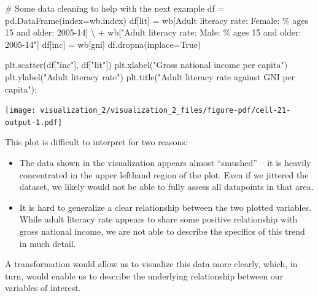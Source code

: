\documentclass[
  letterpaper,
  DIV=11,
  numbers=noendperiod]{scrreprt}
\newenvironment{Shaded}{\begin{snugshade}}{\end{snugshade}}
\newcommand{\CommentTok}[1]{\textcolor[rgb]{0.37,0.37,0.37}{#1}}
\newcommand{\NormalTok}[1]{\textcolor[rgb]{0.00,0.23,0.31}{#1}}
\newcommand{\OperatorTok}[1]{\textcolor[rgb]{0.37,0.37,0.37}{#1}}
\newcommand{\StringTok}[1]{\textcolor[rgb]{0.13,0.47,0.30}{#1}}
\newcommand{\VariableTok}[1]{\textcolor[rgb]{0.07,0.07,0.07}{#1}}
\providecommand{\tightlist}{%
  \setlength{\itemsep}{0pt}\setlength{\parskip}{0pt}}\usepackage{longtable,booktabs,array}
\begin{document}
\begin{Shaded}
\begin{Highlighting}[]
\CommentTok{\# Some data cleaning to help with the next example}
\NormalTok{df }\OperatorTok{=}\NormalTok{ pd.DataFrame(index}\OperatorTok{=}\NormalTok{wb.index)}
\NormalTok{df[}\StringTok{\textquotesingle{}lit\textquotesingle{}}\NormalTok{] }\OperatorTok{=}\NormalTok{ wb[}\StringTok{\textquotesingle{}Adult literacy rate: Female: \% ages 15 and older: 2005{-}14\textquotesingle{}}\NormalTok{] }\OperatorTok{\textbackslash{}}
            \OperatorTok{+}\NormalTok{ wb[}\StringTok{"Adult literacy rate: Male: \% ages 15 and older: 2005{-}14"}\NormalTok{]}
\NormalTok{df[}\StringTok{\textquotesingle{}inc\textquotesingle{}}\NormalTok{] }\OperatorTok{=}\NormalTok{ wb[}\StringTok{\textquotesingle{}gni\textquotesingle{}}\NormalTok{]}
\NormalTok{df.dropna(inplace}\OperatorTok{=}\VariableTok{True}\NormalTok{)}

\NormalTok{plt.scatter(df[}\StringTok{"inc"}\NormalTok{], df[}\StringTok{"lit"}\NormalTok{])}
\NormalTok{plt.xlabel(}\StringTok{"Gross national income per capita"}\NormalTok{)}
\NormalTok{plt.ylabel(}\StringTok{"Adult literacy rate"}\NormalTok{)}
\NormalTok{plt.title(}\StringTok{"Adult literacy rate against GNI per capita"}\NormalTok{)}\OperatorTok{;}
\end{Highlighting}
\end{Shaded}

\texttt{[image: visualization\_2/visualization\_2\_files/figure-pdf/cell-21-output-1.pdf]}

This plot is difficult to interpret for two reasons:

\begin{itemize}
\tightlist
\item
  The data shown in the visualization appears almost ``smushed'' -- it
  is heavily concentrated in the upper lefthand region of the plot. Even
  if we jittered the dataset, we likely would not be able to fully
  assess all datapoints in that area.
\item
  It is hard to generalize a clear relationship between the two plotted
  variables. While adult literacy rate appears to share some positive
  relationship with gross national income, we are not able to describe
  the specifics of this trend in much detail.
\end{itemize}

A transformation would allow us to visualize this data more clearly,
which, in turn, would enable us to describe the underlying relationship
between our variables of interest.
\end{document}
